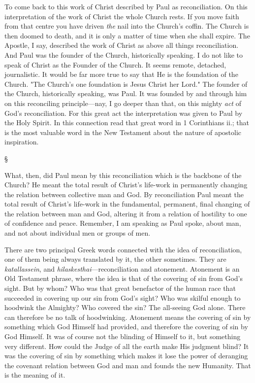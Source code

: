 \documentclass[12pt,a5paper,twoside,titlepage]{book}
\begin{document}
To come back to this work of Christ described 
by Paul as reconciliation. On this 
interpretation of the work of Christ the whole 
Church rests. If you move faith from that 
centre you have driven \textit{the} nail into the Church's 
coffin. The Church is then doomed to death, 
and it is only a matter of time when she 
shall expire. The Apostle, I say, described the 
work of Christ as above all things reconciliation. 
And Paul was the founder of the Church, 
historically speaking. I do not like to speak 
of Christ as the Founder of the Church. It 
seems remote, detached, journalistic. It would 
be far more true to say that He is the foundation 
of the Church. "The Church's one foundation 
is Jesus Christ her Lord." The founder 
of the Church, historically speaking, was Paul. 
It was founded by and through him on this 
reconciling principle---nay, I go deeper than 
that, on this mighty \textit{act} of God's reconciliation. 
For this great act the interpretation was 
given to Paul by the Holy Spirit. In this connection 
read that great word in 1 Corinthians ii.; 
that is the most valuable word in the New 
Testament about the nature of apostolic inspiration. 

\begin{center}
\S
\end{center}

What, then, did Paul mean by this reconciliation 
which is the backbone of the Church? 
He meant the total result of Christ's life-work 
in permanently changing the relation between 
collective man and God. By reconciliation Paul 
meant the total result of Christ's life-work in 
the fundamental, permanent, final changing of 
the relation between man and God, altering 
it from a relation of hostility to one of confidence 
and peace. Remember, I am speaking 
as Paul spoke, about man, and not about 
individual men or groups of men. 

There are two principal Greek words connected 
with the idea of reconciliation, one of 
them being always translated by it, the other 
sometimes. They are \textit{katallassein}, and \textit{hilaskesthai}---reconciliation 
and atonement. Atonement 
is an Old Testament phrase, where the 
idea is that of the covering of sin from God's 
sight. But by whom? Who was that great 
benefactor of the human race that succeeded in 
covering up our sin from God's sight? Who 
was skilful enough to hoodwink the Almighty? 
Who covered the sin? The all-seeing God 
alone. There can therefore be no talk of hoodwinking. Atonement means the covering of 
sin by something which God Himself had 
provided, and therefore the covering of sin by
God Himself. It was of course not the blinding 
of Himself to it, but something very different. 
How could the Judge of all the earth make 
His judgment blind? It was the covering of 
sin by something which makes it lose the power 
of deranging the covenant relation between 
God and man and founds the new Humanity. 
That is the meaning of it. 
\end{document}
